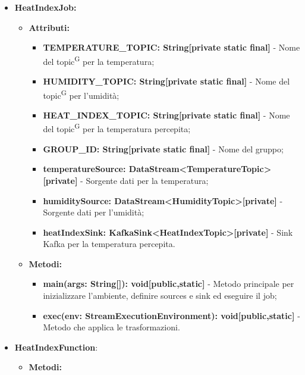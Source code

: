 \documentclass[8pt]{article}
\newcommand{\glossterm}[1]{#1\textsuperscript{G}} %
\begin{document}
\begin{itemize}
	\setlength\itemsep{0em}
    \item \textbf{HeatIndexJob:}
    \begin{itemize}
	\setlength\itemsep{0em}
        \item \textbf{Attributi:}
        \begin{itemize}
	\setlength\itemsep{0em}
            \item \textbf{TEMPERATURE\_TOPIC: String[private static final]} - Nome del \glossterm{topic} per la temperatura;
            \item \textbf{HUMIDITY\_TOPIC: String[private static final]} - Nome del \glossterm{topic} per l'umidità;
            \item \textbf{HEAT\_INDEX\_TOPIC: String[private static final]} - Nome del \glossterm{topic} per la temperatura percepita;
            \item \textbf{GROUP\_ID: String[private static final]} - Nome del gruppo;
            \item \textbf{temperatureSource: DataStream<TemperatureTopic>[private]} - Sorgente dati per la temperatura;
            \item \textbf{humiditySource: DataStream<HumidityTopic>[private]} - Sorgente dati per l'umidità;
            \item \textbf{heatIndexSink: KafkaSink<HeatIndexTopic>[private]} - Sink Kafka per la temperatura percepita.
        \end{itemize}
    \end{itemize}
    \begin{itemize}
	\setlength\itemsep{0em}
        \item \textbf{Metodi:}
        \begin{itemize}
	\setlength\itemsep{0em}
            \item \textbf{main(args: String[]): void[public,static]} - Metodo principale per inizializzare l'ambiente, definire sources e sink ed eseguire il job;
            \item \textbf{exec(env: StreamExecutionEnvironment): void[public,static]} - Metodo che applica le trasformazioni.
        \end{itemize}
    \end{itemize}
    \item \textbf{HeatIndexFunction}:
    \begin{itemize}
	\setlength\itemsep{0em}
        \item \textbf{Metodi:}
        \begin{itemize}

\end{itemize}
\end{itemize}
\end{itemize}
\end{document}
